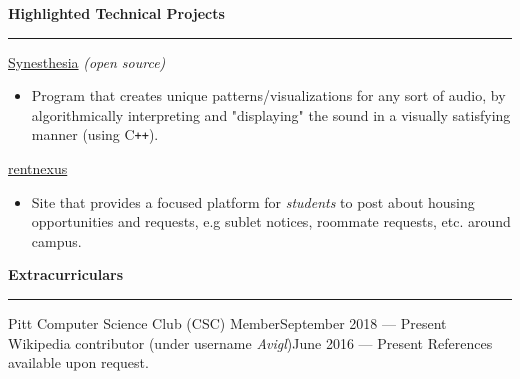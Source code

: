 \documentclass[11pt]{article}
\begin{document}
\begin{flushleft}
		\vspace{1.35mm}
		{\large \raggedright \textbf{Highlighted Technical Projects}}
		\vspace{1.25mm}
	
		\hrule
	
		\vspace{2.25mm}
		\href{https://github.com/avigloz/synesthesia}{Synesthesia} \textit{(open source)}
		\vspace{-2mm}
		\begin{itemize}
			\item Program that creates unique patterns/visualizations for any sort of audio, by algorithmically interpreting and "displaying" the sound in a visually satisfying manner (using C\texttt{++}).
		\end{itemize}
		\vspace{-2mm}
		\href{https://rentnexus.net}{rentnexus}
		\vspace{-2mm}
		\begin{itemize}
			\item Site that provides a focused platform for \textit{students} to post about housing opportunities and requests, e.g sublet notices, roommate requests, etc. around campus.
		\end{itemize}

		\vspace{1.35mm}
		{\large \raggedright \textbf{Extracurriculars}}
		\vspace{1.25mm}
	
		\hrule
	
		\vspace{2.25mm}
		Pitt Computer Science Club (CSC) Member\hfill September 2018 --- Present\\
		Wikipedia contributor (under username \textit{Avigl})\hfill June 2016 --- Present
		\vfill
		References available upon request.
	\end{flushleft}
\end{document}
